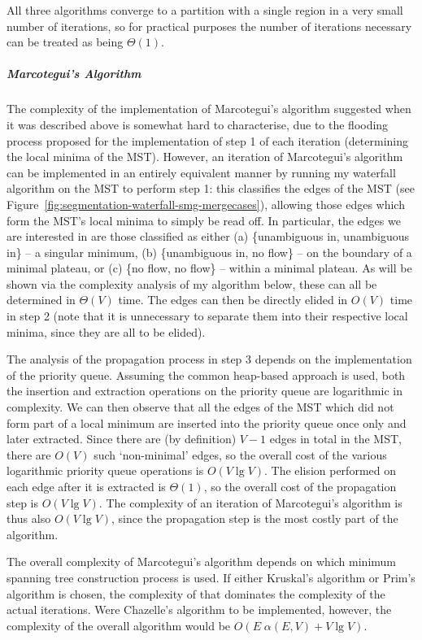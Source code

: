 All three algorithms converge to a partition with a single region in a very small number of iterations, so for practical purposes the number of iterations necessary can be treated as being $\Theta(1)$.

\subparagraph{Marcotegui's Algorithm}

The complexity of the implementation of Marcotegui's algorithm suggested when it was described above is somewhat hard to characterise, due to the flooding process proposed for the implementation of step 1 of each iteration (determining the local minima of the MST). However, an iteration of Marcotegui's algorithm can be implemented in an entirely equivalent manner by running my waterfall algorithm on the MST to perform step 1: this classifies the edges of the MST (see Figure~\ref{fig:segmentation-waterfall-smg-mergecases}), allowing those edges which form the MST's local minima to simply be read off. In particular, the edges we are interested in are those classified as either (a) \{unambiguous in, unambiguous in\} -- a singular minimum, (b) \{unambiguous in, no flow\} -- on the boundary of a minimal plateau, or (c) \{no flow, no flow\} -- within a minimal plateau. As will be shown via the complexity analysis of my algorithm below, these can all be determined in $\Theta(V)$ time. The edges can then be directly elided in $O(V)$ time in step 2 (note that it is unnecessary to separate them into their respective local minima, since they are all to be elided).

The analysis of the propagation process in step 3 depends on the implementation of the priority queue. Assuming the common heap-based approach \cite{clr-pq} is used, both the insertion and extraction operations on the priority queue are logarithmic in complexity. We can then observe that all the edges of the MST which did not form part of a local minimum are inserted into the priority queue once only and later extracted. Since there are (by definition) $V - 1$ edges in total in the MST, there are $O(V)$ such `non-minimal' edges, so the overall cost of the various logarithmic priority queue operations is $O(V \lg V)$. The elision performed on each edge after it is extracted is $\Theta(1)$, so the overall cost of the propagation step is $O(V \lg V)$. The complexity of an iteration of Marcotegui's algorithm is thus also $O(V \lg V)$, since the propagation step is the most costly part of the algorithm.

The overall complexity of Marcotegui's algorithm depends on which minimum spanning tree construction process is used. If either Kruskal's algorithm or Prim's algorithm is chosen, the complexity of that dominates the complexity of the actual iterations. Were Chazelle's algorithm to be implemented, however, the complexity of the overall algorithm would be $O(E \; \alpha(E,V) + V \lg V)$.

